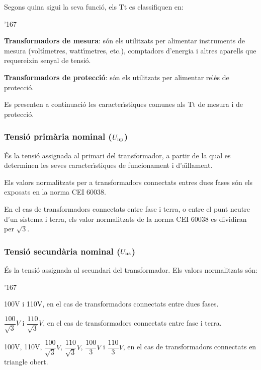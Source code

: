 Segons quina sigui la seva funci\'{o}, els Tt es classifiquen en:
\begin{dinglist}{'167}
   \item \textbf{Transformadors de mesura}: s\'{o}n els utilitzats per alimentar
            instruments de mesura (volt\'{\i}metres, watt\'{\i}metres, etc.),
            comptadors d'energia i altres aparells que requereixin senyal de tensi\'{o}.
   \item \textbf{Transformadors de protecci\'{o}}: s\'{o}n els utilitzats per
   alimentar rel\'{e}s de protecci\'{o}.
\end{dinglist}

Es presenten a continuaci\'{o} les caracter\'{\i}stiques comunes als Tt de
mesura i de protecci\'{o}.

\subsubsection{Tensi\'{o} prim\`{a}ria nominal ($U_\mathrm{np}$)}

\'{E}s la tensi\'{o} assignada al primari del transformador, a partir de la
qual es determinen les seves caracter\'{\i}stiques de funcionament i
d'a\"{\i}llament.

Els valors normalitzats per a transformadors connectats entres dues fases s\'{o}n els exposats en la norma \textsf{CEI 60038}.

En el cas de transformadors connectats entre fase i terra, o entre el punt neutre d'un sistema i terra, els valor normalitzats de la norma \textsf{CEI 60038} es dividiran per $\sqrt{3}$.


\subsubsection{Tensi\'{o} secund\`{a}ria nominal ($U_\mathrm{ns}$)}

\'{E}s la tensi\'{o} assignada al secundari del transformador.
Els valors normalitzats s\'{o}n:
\begin{dinglist}{'167}
    \item 100\unit{V} i 110\unit{V}, en el cas de transformadors connectats
    entre dues fases.
    \item $\dfrac{100}{\sqrt{3}}\unit{V}$ i
        $\dfrac{110}{\sqrt{3}}\unit{V}$, en el cas de transformadors
        connectats entre fase i terra.
    \item 100\unit{V}, 110\unit{V}, $\dfrac{100}{\sqrt{3}}\unit{V}$,
    $\dfrac{110}{\sqrt{3}}\unit{V}$, $\dfrac{100}{3}\unit{V}$   i
    $\dfrac{110}{3}\unit{V}$, en el cas de transformadors
    connectats en triangle obert.
\end{dinglist}

